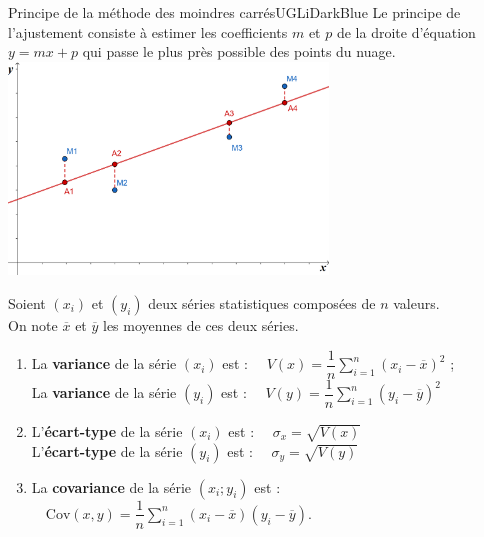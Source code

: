 \documentclass[a4paper,11pt,cours]{nsi} %
\begin{document}
\begin{encadrecolore}{Principe de la méthode des moindres carrés}{UGLiDarkBlue}
    Le principe de l'ajustement consiste à estimer les coefficients $m$ et $p$ de la droite d'équation $y=mx+p$ qui passe le plus près possible des points du nuage.\\
    {\includegraphics[width=8.5cm]{Moindre_carres.png}} 
\end{encadrecolore}

\begin{definition}[s]
    Soient $(x_i)$ et $(y_i)$ deux séries statistiques composées de $n$ valeurs.\\
    On note $\overline{x}$ et $\overline{y}$ les moyennes de ces deux séries.\
    \begin{enumerate}[label=\textbullet]
        \item La \textbf{variance} de la série $(x_i)$ est : $\displaystyle \quad V(x)=\dfrac{1}{n}\sum_{i=1}^n (x_i-\overline{x})^2$ ;\\
        La \textbf{variance} de la série $(y_i)$ est : $\displaystyle \quad V(y)=\dfrac{1}{n}\sum_{i=1}^n (y_i-\overline{y})^2$
        \item L'\textbf{écart-type} de la série $(x_i)$ est : $\displaystyle \quad \sigma_x=\sqrt{V(x)}$\\[.5em]
        L'\textbf{écart-type} de la série $(y_i)$ est : $\displaystyle \quad \sigma_y=\sqrt{V(y)}$
        \item La \textbf{covariance} de la série $(x_i;y_i)$ est :
        $\quad \displaystyle \mathrm{Cov}(x,y)=\dfrac{1}{n}\sum_{i=1}^n (x_i-\overline{x})(y_i-\overline{y})$.
    \end{enumerate}
\end{definition}
\end{document}
